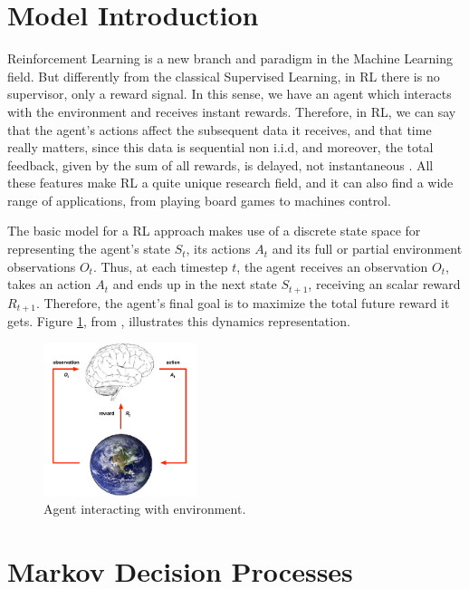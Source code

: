 \section{Model Introduction}

Reinforcement Learning is a new branch and paradigm in the Machine Learning field. But differently from the classical Supervised Learning, in RL there is no supervisor, only a reward signal. In this sense, we have an agent which interacts with the environment and receives instant rewards. Therefore, in RL, we can say that the agent's actions affect the subsequent data it receives, and that time really matters, since this data is sequential non i.i.d, and moreover, the total feedback, given by the sum of all rewards, is delayed, not instantaneous \cite{Sutton1998}. All these features make RL a quite unique research field, and it can also find a wide range of applications, from playing board games to machines control.

The basic model for a RL approach makes use of a discrete state space for representing the agent's state $S_t$, its actions $A_t$ and its full or partial environment observations $O_t$. Thus, at each timestep $t$, the agent receives an observation $O_t$, takes an action $A_t$ and ends up in the next state $S_{t+1}$, receiving an scalar reward $R_{t+1}$. Therefore, the agent's final goal is to maximize the total future reward it gets. Figure \ref{fig:RL_basic_model}, from \cite{lecture1DS}, illustrates this dynamics representation.

\begin{figure}[H]
    \centering
    \includegraphics[width=0.4\textwidth]{Chapter2/RL_basic_model.png} 
    \caption{Agent interacting with environment.}
    \label{fig:RL_basic_model}
\end{figure}


\section{Markov Decision Processes}

